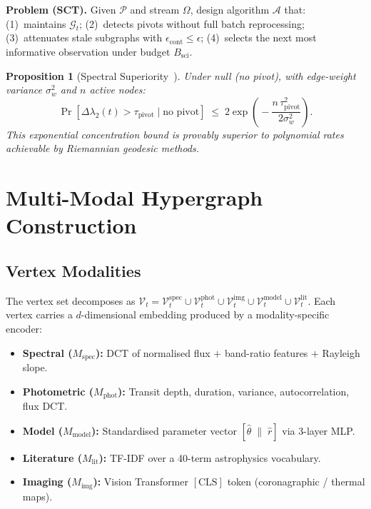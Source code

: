 \documentclass[conference]{IEEEtran}
\newtheorem{proposition}{Proposition}
\newcommand{\dlam}{\Delta\lambda_2}
\newcommand{\epscont}{\epsilon_{\mathrm{cont}}}
\newcommand{\tpivot}{\tau_{\mathrm{pivot}}}
\newcommand{\Gcal}{\mathcal{G}}
\newcommand{\Vcal}{\mathcal{V}}
\begin{document}
\noindent\textbf{Problem (SCT).} Given $\mathcal{P}$ and stream $\Omega$,
design algorithm $\mathcal{A}$ that: (1)~maintains $\Gcal_t$;
(2)~detects pivots without full batch reprocessing;
(3)~attenuates stale subgraphs with $\epscont \leq \epsilon$;
(4)~selects the next most informative observation under budget $B_\mathrm{sci}$.

\begin{proposition}[Spectral Superiority~\cite{sdt2026}]
\label{prop:fpr}
Under null (no pivot), with edge-weight variance $\sigma_w^2$ and $n$
active nodes:
\begin{equation}
  \Pr[\dlam(t) > \tpivot \mid \text{no pivot}]
  \;\leq\; 2\exp\!\left(\!-\frac{n\,\tpivot^2}{2\sigma_w^2}\right).
  \label{eq:fpr_bound}
\end{equation}
This exponential concentration bound is provably superior to polynomial
rates achievable by Riemannian geodesic methods.
\end{proposition}

\section{Multi-Modal Hypergraph Construction}\label{sec:hypergraph}

\subsection{Vertex Modalities}

The vertex set decomposes as
$\Vcal_t = \Vcal^\mathrm{spec}_t \cup \Vcal^\mathrm{phot}_t \cup
\Vcal^\mathrm{img}_t \cup \Vcal^\mathrm{model}_t \cup
\Vcal^\mathrm{lit}_t$.
Each vertex carries a $d$-dimensional embedding produced by a
modality-specific encoder:

\begin{itemize}
  \item \textbf{Spectral ($M_\mathrm{spec}$):} DCT of normalised
        flux $+ $ band-ratio features $+$ Rayleigh slope.
  \item \textbf{Photometric ($M_\mathrm{phot}$):} Transit depth,
        duration, variance, autocorrelation, flux DCT.
  \item \textbf{Model ($M_\mathrm{model}$):} Standardised parameter
        vector $[\hat{\theta}\;\|\;\hat{r}]$ via 3-layer MLP.
  \item \textbf{Literature ($M_\mathrm{lit}$):} TF-IDF over a 40-term
        astrophysics vocabulary.
  \item \textbf{Imaging ($M_\mathrm{img}$):} Vision Transformer
        $[\mathrm{CLS}]$ token (coronagraphic / thermal maps).
\end{itemize}
\end{document}
